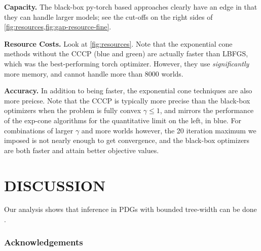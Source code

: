 \documentclass[twoside]{article}
\begin{document}
\textbf{Capacity.}
The black-box py-torch based approaches clearly have an edge in that they can handle larger models; see the cut-offs on the right sides of \cref{fig:resources,fig:gap-resource-fine}.

\textbf{Resource Costs.}
Look at \cref{fig:resources}.
Note that the exponential cone methods without the CCCP (blue and green) are actually faster than LBFGS, which was the best-performing torch optimizer.
However, they use \emph{significantly} more memory, and cannot handle more than 8000 worlds.


\textbf{Accuracy.}
In addition to being faster, the exponential cone techniques are also more preicse.
Note that the CCCP is typically more precise than the black-box optimizers when the problem is fully convex $\gamma \le 1$, and mirrors the performance of the exp-cone algorithms for the quantitative limit on the left, in blue.  For combinations of larger $\gamma$ and more worlds however, the 20 iteration maximum we imposed is not nearly enough to get convergence, and the black-box optimizers are both faster and attain better objective values.

\section{DISCUSSION}

Our analysis shows that inference in PDGs with bounded tree-width can be done .






\subsubsection*{Acknowledgements}
\end{document}
